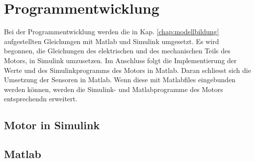 \newpage




\chapter{Programmentwicklung}
\label{chap:Programmentwicklung}
Bei der Programmentwicklung werden die in Kap. \ref{chap:modellbildung} aufgestellten Gleichungen mit Matlab und Simulink umgesetzt.
Es wird begonnen, die Gleichungen des elektrischen und des mechanischen Teils des Motors, in Simulink umzusetzen.
Im Anschluss folgt die Implementierung der Werte und des Simulinkprogramms des Motors in Matlab.
Daran schliesst sich die Umsetzung der Sensoren in Matlab.
Wenn diese mit Matlabfiles eingebunden werden können, werden die Simulink- und Matlabprogramme des Motors entsprechendn erweitert.

\section{Motor in Simulink}

\section{Matlab}

\section{}